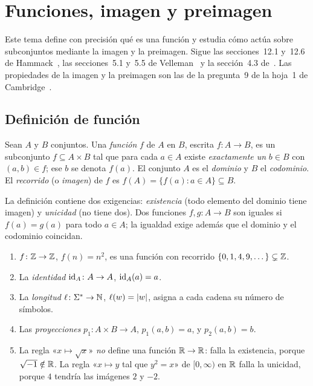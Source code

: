 \chapter{Funciones, imagen y preimagen}
\label{tema:2}

Este tema define con precisión qué es una función y estudia cómo actúa sobre subconjuntos mediante la imagen y la preimagen. Sigue las secciones~12.1 y~12.6 de Hammack~\cite{hammack}, las secciones~5.1 y~5.5 de Velleman~\cite{velleman} y la sección~4.3 de~\cite{mcs}. Las propiedades de la imagen y la preimagen son las de la pregunta~9 de la hoja~1 de Cambridge~\cite{camns}.

\section{Definición de función}

\begin{definicion}[Función]\label{def:t2-funcion}
Sean $A$ y $B$ conjuntos. Una \emph{función} $f$ de $A$ en $B$, escrita $f\colon A\to B$, es un subconjunto $f\subseteq A\times B$ tal que para cada $a\in A$ existe \emph{exactamente un} $b\in B$ con $(a,b)\in f$; ese $b$ se denota $f(a)$. El conjunto $A$ es el \emph{dominio} y $B$ el \emph{codominio}. El \emph{recorrido} (o \emph{imagen}) de $f$ es $f(A)=\{f(a): a\in A\}\subseteq B$.
\end{definicion}

La definición contiene dos exigencias: \emph{existencia} (todo elemento del dominio tiene imagen) y \emph{unicidad} (no tiene dos). Dos funciones $f,g\colon A\to B$ son iguales si $f(a)=g(a)$ para todo $a\in A$; la igualdad exige además que el dominio y el codominio coincidan.

\begin{ejemplo}\label{ej:t2-funciones}
\begin{enumerate}
  \item $f\colon\mathbb{Z}\to\mathbb{Z}$, $f(n)=n^{2}$, es una función con recorrido $\{0,1,4,9,\dots\}\subsetneq\mathbb{Z}$.
  \item La \emph{identidad} $\mathrm{id}_A\colon A\to A$, $\mathrm{id}_A(a)=a$.
  \item La \emph{longitud} $\ell\colon\Sigma^{*}\to\mathbb{N}$, $\ell(w)=\lvert w\rvert$, asigna a cada cadena su número de símbolos.
  \item Las \emph{proyecciones} $p_1\colon A\times B\to A$, $p_1(a,b)=a$, y $p_2(a,b)=b$.
  \item La regla «$x\mapsto\sqrt{x}$» \emph{no} define una función $\mathbb{R}\to\mathbb{R}$: falla la existencia, porque $\sqrt{-1}\notin\mathbb{R}$. La regla «$x\mapsto y$ tal que $y^{2}=x$» de $[0,\infty)$ en $\mathbb{R}$ falla la unicidad, porque $4$ tendría las imágenes $2$ y $-2$.
\end{enumerate}
\end{ejemplo}

